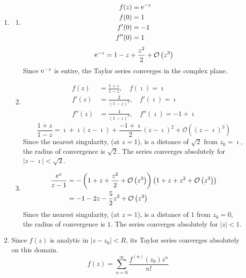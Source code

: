 {\begin{Solution}
  \label{solution 3 terms e-z}
  \begin{enumerate}
  \item 
    \begin{enumerate}
    \item 
      \begin{align*}
        f(z) &= \mathop{\mathrm{e}}\nolimits^{-z}
        \\
        f(0) &= 1
        \\
        f'(0) &= -1
        \\
        f''(0) &= 1
      \end{align*}
      \[
      \mathop{\mathrm{e}}\nolimits^{-z} = 1 - z + \frac{z^2}{2} + \mathcal{O}\left( z^3 \right)
      \]
      Since $\mathop{\mathrm{e}}\nolimits^{-z}$ is entire, the Taylor series converges in the complex plane.
    \item 
      \begin{align*}
        f(z) &= \frac{1+z}{1-z}, \quad f(\imath) = \imath
        \\
        f'(z) &= \frac{2}{(1 - z)^2}, \quad f'(\imath) = \imath
        \\
        f''(z) &= \frac{4}{(1 - z)^3}, \quad f''(\imath) = -1 + \imath
      \end{align*}
      \[
      \frac{1+z}{1-z} = \imath + \imath (z - \imath) + \frac{-1 + \imath}{2} (z - \imath)^2 
      + \mathcal{O}\left( (z - \imath)^3 \right)
      \]
      Since the nearest singularity, (at $z = 1$), is a distance of $\sqrt{2}$
      from $z_0 = \imath$, the radius of convergence is $\sqrt{2}$.  The series 
      converges absolutely for $|z - \imath| < \sqrt{2}$.
    \item 
      \begin{align*}
        \frac{\mathop{\mathrm{e}}\nolimits^z}{z-1}
        &= - \left( 1 + z + \frac{z^2}{2} + \mathcal{O}\left( z^3 \right) \right)
        \left( 1 + z + z^2 + \mathcal{O}\left( z^3 \right) \right)
        \\
        &= -1 - 2 z - \frac{5}{2} z^2 + \mathcal{O}\left( z^3 \right)
      \end{align*}
      Since the nearest singularity, (at $z = 1$), is a distance of $1$
      from $z_0 = 0$, the radius of convergence is $1$.  The series 
      converges absolutely for $|z| < 1$.
    \end{enumerate}
  \item 
    Since $f(z)$ is analytic in $|z - z_0| < R$, its Taylor series converges 
    absolutely on this domain.
    \[
    f(z) = \sum_{n = 0}^\infty \frac{ f^{(n)}(z_0) z^n }{ n! }
\]
\end{enumerate}
\end{Solution}}
